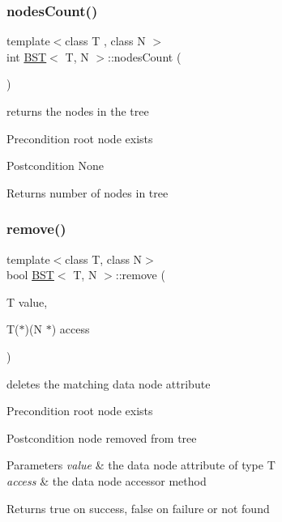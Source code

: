 \subsubsection{\texorpdfstring{nodes\+Count()}{nodesCount()}}
{\footnotesize\ttfamily template$<$class T , class N $>$ \\
int \hyperlink{class_b_s_t}{B\+ST}$<$ T, N $>$\+::nodes\+Count (\begin{DoxyParamCaption}{ }\end{DoxyParamCaption})}

returns the nodes in the tree \begin{DoxyPrecond}{Precondition}
root node exists 
\end{DoxyPrecond}
\begin{DoxyPostcond}{Postcondition}
None 
\end{DoxyPostcond}
\begin{DoxyReturn}{Returns}
number of nodes in tree 
\end{DoxyReturn}
\mbox{\label{class_b_s_t_aef5667b555733710dbe17aa7218e248d}} 
\subsubsection{\texorpdfstring{remove()}{remove()}}
{\footnotesize\ttfamily template$<$class T, class N$>$ \\
bool \hyperlink{class_b_s_t}{B\+ST}$<$ T, N $>$\+::remove (\begin{DoxyParamCaption}\item[{T}]{value,  }\item[{T($\ast$)(N $\ast$)}]{access }\end{DoxyParamCaption})}

deletes the matching data node attribute \begin{DoxyPrecond}{Precondition}
root node exists 
\end{DoxyPrecond}
\begin{DoxyPostcond}{Postcondition}
node removed from tree 
\end{DoxyPostcond}

\begin{DoxyParams}{Parameters}
{\em value} & the data node attribute of type T \\
\hline
{\em access} & the data node accessor method \\
\hline
\end{DoxyParams}
\begin{DoxyReturn}{Returns}
true on success, false on failure or not found 
\end{DoxyReturn}
\mbox{\label{class_b_s_t_a3e958de8a85c1268b11006a3ed32a7bb}} 
